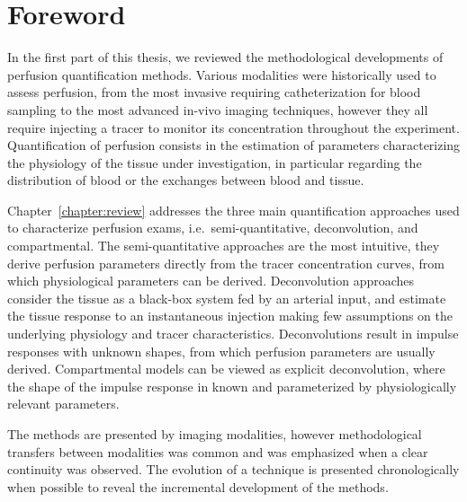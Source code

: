 \chapter*{Foreword}
In the first part of this thesis, we reviewed the methodological developments of perfusion quantification methods.
Various modalities were historically used to assess perfusion, from the most invasive requiring catheterization for blood sampling to the most advanced in-vivo imaging techniques, however they all require injecting a tracer to monitor its concentration throughout the experiment.
Quantification of perfusion consists in the estimation of parameters characterizing the physiology of the tissue under investigation, in particular regarding the distribution of blood or the exchanges between blood and tissue.

Chapter~\ref{chapter:review} addresses the three main quantification approaches used to characterize perfusion exams, i.e.~semi-quantitative, deconvolution, and compartmental.
The semi-quantitative approaches are the most intuitive, they derive perfusion parameters directly from the tracer concentration curves, from which physiological parameters can be derived.
Deconvolution approaches consider the tissue as a black-box system fed by an arterial input, and estimate the tissue response to an instantaneous injection making few assumptions on the underlying physiology and tracer characteristics. 
Deconvolutions result in impulse responses with unknown shapes, from which perfusion parameters are usually derived.
Compartmental models can be viewed as explicit deconvolution, where the shape of the impulse response in known and parameterized by physiologically relevant parameters.

The methods are presented by imaging modalities, however methodological transfers between modalities was common and was emphasized when a clear continuity was observed. 
The evolution of a technique is presented chronologically when possible to reveal the incremental development of the methods.
